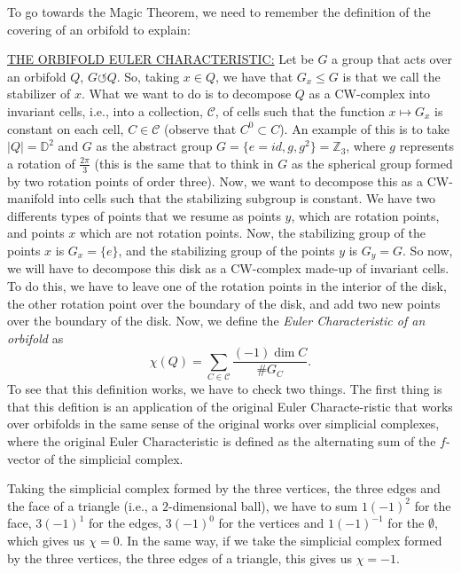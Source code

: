 To go towards the Magic Theorem, we need to remember the definition of the covering of an orbifold to explain: \newline

\underline{THE ORBIFOLD EULER CHARACTERISTIC:} \newline \newline
Let be $G$ a group that acts over an orbifold $Q$, $G \circlearrowleft Q$. \newline
So, taking $x \in Q$, we have that $G_{x} \leq G$ is that we call the stabilizer of $x$. \newline
What we want to do is to decompose $Q$ as a CW-complex into invariant cells, i.e., into a collection, $\mathcal{C}$, of cells such that the function $x \mapsto G_{x}$ is constant on each cell, $C \in \mathcal{C}$ (observe that $C^{0} \subset C$). \newline
An example of this is to take $\vert Q \vert = \mathbb{D}^{2}$ and $G$ as the abstract group $G = \lbrace e = id, g, g^{2} \rbrace = \mathbb{Z}_{3}$, where $g$ represents a rotation of $\frac{2 \pi}{3}$ (this is the same that to think in $G$ as the spherical group formed by two rotation points of order three). Now, we want to decompose this as a CW-manifold into cells such that the stabilizing subgroup is constant. We have two differents types of points that we resume as points $y$, which are rotation points, and points $x$ which are not rotation points. Now, the stabilizing group of the points $x$ is $G_{x} = \lbrace e \rbrace$, and the stabilizing group of the points $y$ is $G_{y} = G$. So now, we will have to decompose this disk as a CW-complex made-up of invariant cells. To do this, we have to leave one of the rotation points in the interior of the disk, the other rotation point over the boundary of the disk, and add two new points over the boundary of the disk. \newline
Now, we define the \textsl{Euler Characteristic of an orbifold} as $$\chi (Q) = \sum_{C \in \mathcal{C}} \frac{(-1) \dim C}{\# G_{C}}.$$
To see that this definition works, we have to check two things. \newline
The first thing is that this defition is an application of the original Euler Characte-ristic that works over orbifolds in the same sense of the original works over simplicial complexes, where the original Euler Characteristic is defined as the alternating sum of the $f$-vector of the simplicial complex.
\begin{example} Taking the simplicial complex formed by the three vertices, the three edges and the face of a triangle (i.e., a $2$-dimensional ball), we have to sum $1(-1)^{2}$ for the face, $3(-1)^{1}$ for the edges, $3(-1)^{0}$ for the vertices and $1(-1)^{-1}$ for the $\emptyset$, which gives us $\chi = 0$. \newline
In the same way, if we take the simplicial complex formed by the three vertices, the three edges of a triangle, this gives us $\chi = -1$. \newline
\end{example}

